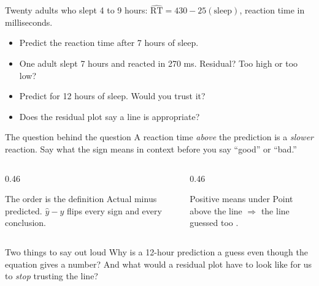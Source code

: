 \documentclass[aspectratio=169, 11pt]{beamer}
\begin{document}
\begin{frame}[t, plain]
  Twenty adults who slept 4 to 9 hours: \quad
  $\widehat{\text{RT}} = 430 - 25(\text{sleep})$, reaction time in milliseconds.
  \begin{itemize}\setlength{\itemsep}{5pt}
    \item Predict the reaction time after 7 hours of sleep.
    \item One adult slept 7 hours and reacted in 270 ms. Residual? Too high or too low?
    \item Predict for 12 hours of sleep. Would you trust it?
    \item Does the residual plot say a line is appropriate?
  \end{itemize}
  \begin{block}{The question behind the question}
    A reaction time \emph{above} the prediction is a \emph{slower} reaction. Say what the
    sign means in  context before you say ``good'' or ``bad.''
  \end{block}
\end{frame}

\begin{frame}[t, plain]
  \vspace{6pt}
  \begin{columns}[t]
    \begin{column}{0.46\textwidth}
      \begin{block}{The order is the definition}
        Actual minus predicted. $\hat{y} - y$ flips every sign and every conclusion.
      \end{block}
    \end{column}
    \begin{column}{0.46\textwidth}
      \begin{block}{Positive means under}
        Point above the line $\Rightarrow$ the line guessed too .
      \end{block}
    \end{column}
  \end{columns}
  \vspace{12pt}
  \begin{block}{Two things to say out loud}
    Why is a 12-hour prediction a guess even though the equation gives a number? And what
    would a residual plot have to look like for us to \emph{stop} trusting the line?
  \end{block}
\end{frame}
\end{document}
